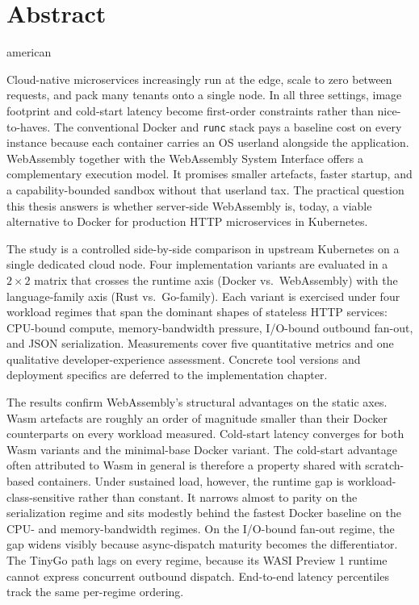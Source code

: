 \chapter*{Abstract}
\begin{otherlanguage*}{american}

\begin{sloppypar}
Cloud-native microservices increasingly run at the edge, scale to zero between requests, and pack many tenants onto a single node. In all three settings, image footprint and cold-start latency become first-order constraints rather than nice-to-haves. The conventional Docker and \texttt{runc} stack pays a baseline cost on every instance because each container carries an OS userland alongside the application. WebAssembly together with the WebAssembly System Interface offers a complementary execution model. It promises smaller artefacts, faster startup, and a capability-bounded sandbox without that userland tax. The practical question this thesis answers is whether server-side WebAssembly is, today, a viable alternative to Docker for production HTTP microservices in Kubernetes.
\end{sloppypar}

The study is a controlled side-by-side comparison in upstream Kubernetes on a single dedicated cloud node. Four implementation variants are evaluated in a $2 \times 2$ matrix that crosses the runtime axis (Docker vs.\ WebAssembly) with the language-family axis (Rust vs.\ Go-family). Each variant is exercised under four workload regimes that span the dominant shapes of stateless HTTP services: CPU-bound compute, memory-bandwidth pressure, I/O-bound outbound fan-out, and JSON serialization. Measurements cover five quantitative metrics and one qualitative developer-experience assessment. Concrete tool versions and deployment specifics are deferred to the implementation chapter.

The results confirm WebAssembly's structural advantages on the static axes. Wasm artefacts are roughly an order of magnitude smaller than their Docker counterparts on every workload measured. Cold-start latency converges for both Wasm variants and the minimal-base Docker variant. The cold-start advantage often attributed to Wasm in general is therefore a property shared with scratch-based containers. Under sustained load, however, the runtime gap is workload-class-sensitive rather than constant. It narrows almost to parity on the serialization regime and sits modestly behind the fastest Docker baseline on the CPU- and memory-bandwidth regimes. On the I/O-bound fan-out regime, the gap widens visibly because async-dispatch maturity becomes the differentiator. The TinyGo path lags on every regime, because its WASI Preview 1 runtime cannot express concurrent outbound dispatch. End-to-end latency percentiles track the same per-regime ordering.


\end{otherlanguage*}
